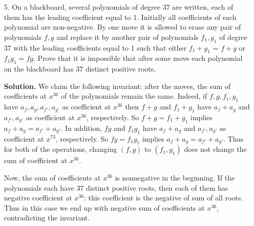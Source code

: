 \documentclass[11pt,a4paper]{article}
\begin{document}
\begin{enumerate}
	\item[5.]
	On a blackboard, several polynomials of degree 37 are written, each of them has the leading
	coefficient equal to 1. Initially all coefficients of each polynomial are non-negative. By one
	move it is allowed to erase any pair of polynomials $f, g$ and replace it by another pair
	of polynomials $f_1, g_1$ of degree 37 with the leading coefficients equal to 1 such that either
	$f_1+g_1$ = $f+g$ or $f_1g_1 = fg$. Prove that it is impossible that after some move each polynomial
	on the blackboard has 37 distinct positive roots.
	
	\textbf{Solution.} 
	We claim the following invariant: 
	after the moves, the sum of  coefficients at $x^{36}$ of the polynomials remain the same. 
	Indeed, if 
	$f, g, f_1, g_1$ have $a_f, a_g, a_{f'}, a_{g'}$ as coefficient at $x^{36}$ then 
	$f+g$ and $f_1+g_1$ have $a_f+a_g$ and $a_{f'}, a_{g'}$ as coefficient at $x^{36}$, respectively. 
	So $f+g=f_1+g_1$ implies $a_f+a_g=a_{f'}+a_{g'}$. 
	In addition, $fg$ and $f_1g_1$ have $a_f+a_g$ and $a_{f'}, a_{g'}$ as coefficient at $x^{73}$, respectively. 
	So $fg=f_1g_1$ implies $a_f+a_g=a_{f'}+a_{g'}$. 
	Thus for both of the operations, 
	changing $(f, g)$ to $(f_1, g_1)$ does not change the sum of coefficient at $x^{36}$. 
	
	Now, the sum of coefficients at $x^{36}$ is nonnegative in the beginning. 
	If the polynomials each have 37 distinct positive roots, then each of them has negative coefficient at $x^{36}$: this coefficient is the negative of sum of all roots. 
	Thus in this case we end up with negative sum of coefficients at $x^{36}$, contradicting the invariant. 
\end{enumerate}
\end{document}
